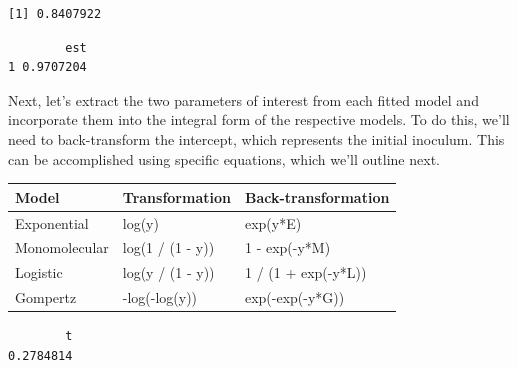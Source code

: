 \documentclass[
  letterpaper,
]{book}
\newenvironment{Shaded}{\begin{snugshade}}{\end{snugshade}}
\newcommand{\CommentTok}[1]{\textcolor[rgb]{0.37,0.37,0.37}{#1}}
\newcommand{\DecValTok}[1]{\textcolor[rgb]{0.68,0.00,0.00}{#1}}
\newcommand{\FunctionTok}[1]{\textcolor[rgb]{0.28,0.35,0.67}{#1}}
\newcommand{\NormalTok}[1]{\textcolor[rgb]{0.00,0.23,0.31}{#1}}
\newcommand{\OtherTok}[1]{\textcolor[rgb]{0.00,0.23,0.31}{#1}}
\newcommand{\SpecialCharTok}[1]{\textcolor[rgb]{0.37,0.37,0.37}{#1}}
\begin{document}
\begin{verbatim}
[1] 0.8407922
\end{verbatim}

\begin{Shaded}
\end{Shaded}

\begin{verbatim}
        est
1 0.9707204
\end{verbatim}

Next, let's extract the two parameters of interest from each fitted
model and incorporate them into the integral form of the respective
models. To do this, we'll need to back-transform the intercept, which
represents the initial inoculum. This can be accomplished using specific
equations, which we'll outline next.

\begin{longtable}[]{@{}lll@{}}
\toprule\noalign{}
Model & Transformation & Back-transformation \\
\midrule\noalign{}
\endhead
\bottomrule\noalign{}
\endlastfoot
Exponential & log(y) & exp(y*E) \\
Monomolecular & log(1 / (1 - y)) & 1 - exp(-y*M) \\
Logistic & log(y / (1 - y)) & 1 / (1 + exp(-y*L)) \\
Gompertz & -log(-log(y)) & exp(-exp(-y*G)) \\
\end{longtable}

\begin{Shaded}
\end{Shaded}

\begin{verbatim}
        t 
0.2784814 
\end{verbatim}
\end{document}
